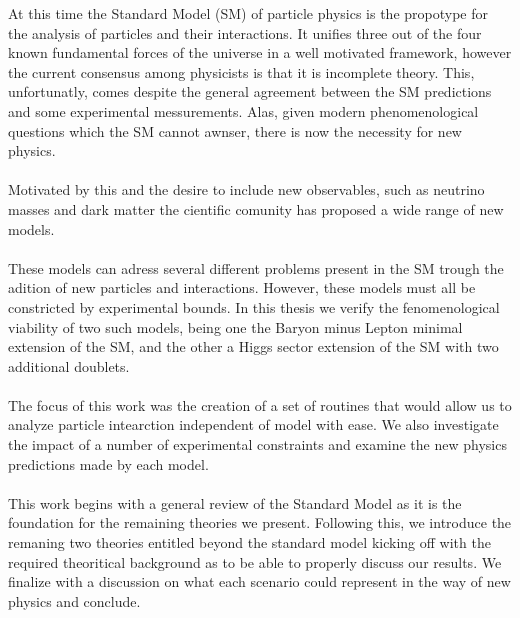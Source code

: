 \documentclass[10pt]{book}
\renewcommand{\(}{\left(}
\renewcommand{\)}{\right)}
\renewcommand{\[}{\left[}
\renewcommand{\]}{\right]}
\begin{document}
\TitlePage
  \vspace*{55mm}
       {%
       At this time the Standard Model (SM) of particle physics is the propotype for the analysis of particles and their interactions. 
       It unifies three out of the four known fundamental forces of the universe in a well motivated framework, however the current consensus among physicists is that it is incomplete theory. 
       This, unfortunatly, comes despite the general agreement between the SM predictions and some experimental messurements. 
       Alas, given modern phenomenological questions which the SM cannot awnser, there is now the necessity for new physics.  
       \\ \ \\ 
       Motivated by this and the desire to include new observables, such as neutrino masses and dark matter the cientific comunity has proposed a wide range of new models. 
       \\ \ \\ 
       These models can adress several different problems present in the SM trough the adition of new particles and interactions. 
       However, these models must all be constricted by experimental bounds. 
       In this thesis we verify the fenomenological viability of two such models, being one the Baryon minus Lepton minimal extension of the SM, and the other a Higgs sector extension of the SM with two additional doublets. 
       \\ \ \\ 
       The focus of this work was the creation of a set of routines that would allow us to analyze particle intearction independent of model with ease. 
       We also investigate the impact of a number of experimental constraints and examine the new physics predictions made by each model. 
       \\ \ \\ 
       This work begins with a general review of the Standard Model as it is the foundation for the remaining theories we present.
       Following this, we introduce the remaning two theories entitled beyond the standard model kicking off with the required theoritical background as to be able to properly discuss our results. 
       We finalize with a discussion on what each scenario could represent in the way of new physics and conclude. 
       }
\EndTitlePage
\titlepage\ \endtitlepage %
\end{document}
